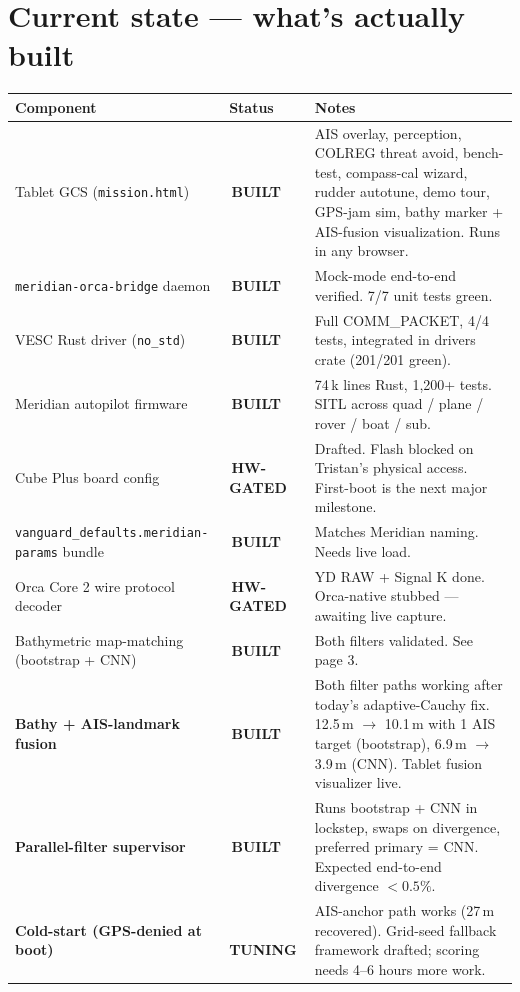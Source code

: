 \documentclass[10pt,a4paper]{article}
\newcommand{\statusbuilt}{{\color{white}\colorbox{mSafe}{\small\bfseries\,BUILT\,}}}
\newcommand{\statustuning}{{\color{white}\colorbox{mWarn}{\small\bfseries\,TUNING\,}}}
\newcommand{\statushardware}{{\color{white}\colorbox{mDim}{\small\bfseries\,HW-GATED\,}}}
\begin{document}
\section{Current state — what's actually built}
\begin{tabularx}{\textwidth}{@{}l l X@{}}
\toprule
\textbf{Component} & \textbf{Status} & \textbf{Notes} \\
\midrule
\rowcolor{mRow} Tablet GCS (\texttt{mission.html}) & \statusbuilt & AIS overlay, perception, COLREG threat avoid, bench-test, compass-cal wizard, rudder autotune, demo tour, GPS-jam sim, bathy marker + AIS-fusion visualization. Runs in any browser. \\
\texttt{meridian-orca-bridge} daemon & \statusbuilt & Mock-mode end-to-end verified. 7/7 unit tests green. \\
\rowcolor{mRow} VESC Rust driver (\texttt{no\_std}) & \statusbuilt & Full COMM\_PACKET, 4/4 tests, integrated in drivers crate (201/201 green). \\
Meridian autopilot firmware & \statusbuilt & 74\,k lines Rust, 1{,}200+ tests. SITL across quad / plane / rover / boat / sub. \\
\rowcolor{mRow} Cube Plus board config & \statushardware & Drafted. Flash blocked on Tristan's physical access. First-boot is the next major milestone. \\
\texttt{vanguard\_defaults.meridian-params} bundle & \statusbuilt & Matches Meridian naming. Needs live load. \\
\rowcolor{mRow} Orca Core 2 wire protocol decoder & \statushardware & YD RAW + Signal K done. Orca-native stubbed — awaiting live capture. \\
Bathymetric map-matching (bootstrap + CNN) & \statusbuilt & Both filters validated. See page 3. \\
\rowcolor{mRow} \textbf{Bathy + AIS-landmark fusion} & \statusbuilt & Both filter paths working after today's adaptive-Cauchy fix. 12.5\,m $\to$ 10.1\,m with 1 AIS target (bootstrap), 6.9\,m $\to$ 3.9\,m (CNN). Tablet fusion visualizer live. \\
\textbf{Parallel-filter supervisor} & \statusbuilt & Runs bootstrap + CNN in lockstep, swaps on divergence, preferred primary = CNN. Expected end-to-end divergence $<0.5\%$. \\
\rowcolor{mRow} \textbf{Cold-start (GPS-denied at boot)} & \statustuning & AIS-anchor path works (27\,m recovered). Grid-seed fallback framework drafted; scoring needs 4--6 hours more work. \\

\end{tabularx}
\end{document}
